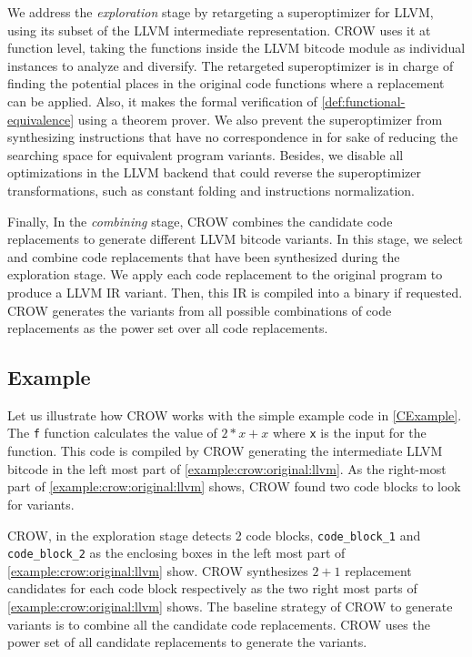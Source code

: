 We address the \emph{exploration} stage  by retargeting a superoptimizer for  LLVM, using its subset of the LLVM intermediate representation. CROW uses it at function level, taking the functions inside the LLVM bitcode module as individual instances to analyze and diversify. The retargeted superoptimizer is in charge of finding the potential places in the original code functions where a replacement can be applied. Also, it makes the formal verification of \autoref{def:functional-equivalence} using a theorem prover. 
We also prevent the superoptimizer from synthesizing instructions that have no correspondence in \wasm for sake of reducing the searching space for equivalent program variants. Besides, we disable all optimizations in the \wasm LLVM backend that could reverse the superoptimizer transformations, such as constant folding and instructions normalization.


Finally, In the \emph{combining} stage, CROW combines the candidate code replacements to generate different LLVM bitcode variants. In this stage, we select and combine code replacements that have been synthesized during the exploration stage. We apply each code replacement to the original program to produce a LLVM IR variant.
Then, this IR is compiled into a \wasm binary if requested. CROW generates the variants from all possible combinations of code replacements as the power set over all code replacements.  

\subsection{Example}
\label{section:crow:example}
 Let us illustrate how CROW works with the simple example code in \autoref{CExample}. The \texttt{f} function calculates the value of $2 * x + x$ where \texttt{x} is the input for the function.  This code is compiled by CROW generating the intermediate LLVM bitcode in the left most part of \autoref{example:crow:original:llvm}. As the right-most part of \autoref{example:crow:original:llvm} shows, CROW found two code blocks to look for variants.  


    

CROW, in the exploration stage detects 2 code blocks, \texttt{code\_block\_1} and \texttt{code\_block\_2} as the enclosing boxes in the left most part of \autoref{example:crow:original:llvm} show. CROW synthesizes $2 + 1$ replacement candidates for each code block respectively as the two right most parts of \autoref{example:crow:original:llvm} shows.
The baseline strategy of CROW to generate variants is to combine all the candidate code replacements. CROW uses the power set of all candidate replacements to generate the variants.

